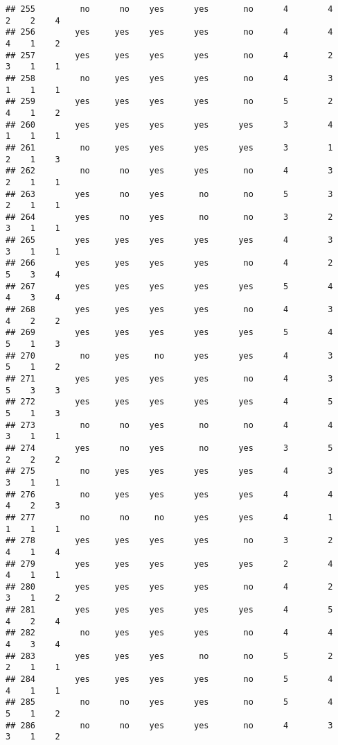 \documentclass[
]{article}
\begin{document}
\begin{verbatim}
## 255         no      no    yes      yes       no      4        4     2    2    4
## 256        yes     yes    yes      yes       no      4        4     4    1    2
## 257        yes     yes    yes      yes       no      4        2     3    1    1
## 258         no     yes    yes      yes       no      4        3     1    1    1
## 259        yes     yes    yes      yes       no      5        2     4    1    2
## 260        yes     yes    yes      yes      yes      3        4     1    1    1
## 261         no     yes    yes      yes      yes      3        1     2    1    3
## 262         no      no    yes      yes       no      4        3     2    1    1
## 263        yes      no    yes       no       no      5        3     2    1    1
## 264        yes      no    yes       no       no      3        2     3    1    1
## 265        yes     yes    yes      yes      yes      4        3     3    1    1
## 266        yes     yes    yes      yes       no      4        2     5    3    4
## 267        yes     yes    yes      yes      yes      5        4     4    3    4
## 268        yes     yes    yes      yes       no      4        3     4    2    2
## 269        yes     yes    yes      yes      yes      5        4     5    1    3
## 270         no     yes     no      yes      yes      4        3     5    1    2
## 271        yes     yes    yes      yes       no      4        3     5    3    3
## 272        yes     yes    yes      yes      yes      4        5     5    1    3
## 273         no      no    yes       no       no      4        4     3    1    1
## 274        yes      no    yes       no      yes      3        5     2    2    2
## 275         no     yes    yes      yes      yes      4        3     3    1    1
## 276         no     yes    yes      yes      yes      4        4     4    2    3
## 277         no      no     no      yes      yes      4        1     1    1    1
## 278        yes     yes    yes      yes       no      3        2     4    1    4
## 279        yes     yes    yes      yes      yes      2        4     4    1    1
## 280        yes     yes    yes      yes       no      4        2     3    1    2
## 281        yes     yes    yes      yes      yes      4        5     4    2    4
## 282         no     yes    yes      yes       no      4        4     4    3    4
## 283        yes     yes    yes       no       no      5        2     2    1    1
## 284        yes     yes    yes      yes       no      5        4     4    1    1
## 285         no      no    yes      yes       no      5        4     5    1    2
## 286         no      no    yes      yes       no      4        3     3    1    2

\end{verbatim}
\end{document}
